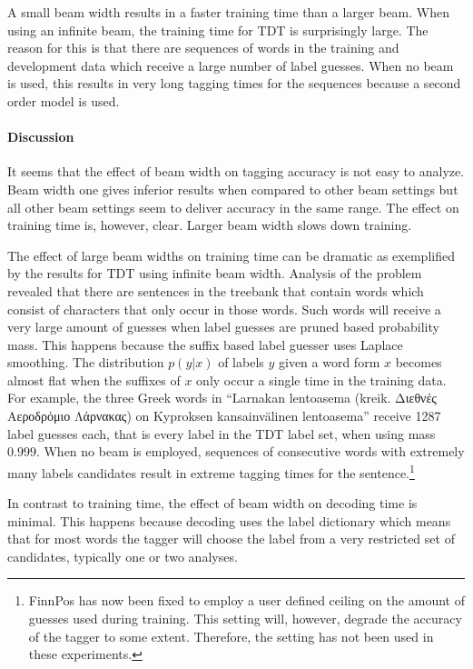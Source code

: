 A small beam width results in a faster training time than a larger
beam. When using an infinite beam, the training time for TDT is
surprisingly large. The reason for this is that there are sequences of
words in the training and development data which receive a large
number of label guesses. When no beam is used, this results in very
long tagging times for the sequences because a second order model is
used.

\paragraph{Discussion} It seems that the effect of beam width on
tagging accuracy is not easy to analyze. Beam width one gives inferior
results when compared to other beam settings but all other beam
settings seem to deliver accuracy in the same range. The effect on
training time is, however, clear. Larger beam width slows down
training. 

The effect of large beam widths on training time can be dramatic as
exemplified by the results for TDT using infinite beam width. Analysis
of the problem revealed that there are sentences in the treebank that
contain words which consist of characters that only occur in those
words. Such words will receive a very large amount of guesses when
label guesses are pruned based probability mass. This happens because
the suffix based label guesser uses Laplace smoothing. The
distribution $p(y|x)$ of labels $y$ given a word form $x$ becomes
almost flat when the suffixes of $x$ only occur a single time in the
training data. For example, the three Greek words in ``Larnakan
lentoasema (kreik. Διεθνές Aεροδρόμιο Λάρνακας) on Kyproksen
kansainvälinen lentoasema'' receive 1287 label guesses each, that is
every label in the TDT label set, when using mass $0.999$. When no
beam is employed, sequences of consecutive words with extremely many
labels candidates result in extreme tagging times for the
sentence.\footnote{FinnPos has now been fixed to employ a user defined
  ceiling on the amount of guesses used during training. This setting
  will, however, degrade the accuracy of the tagger to some
  extent. Therefore, the setting has not been used in these
  experiments.}

In contrast to training time, the effect of beam width on decoding
time is minimal. This happens because decoding uses the label
dictionary which means that for most words the tagger will choose the
label from a very restricted set of candidates, typically one or two
analyses.

